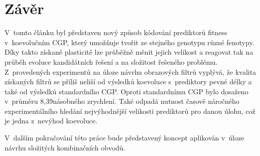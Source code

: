 \documentclass[czech]{ExcelAtFIT} %
\begin{document}
\section{Závěr}
\label{sec:Conclusions}

V~tomto článku byl představen nový způsob kódování prediktorů fitness v~koevolučním CGP, který umožňuje tvořit ze stejného genotypu různé fenotypy. Díky takto získaně plasticitě lze průběžně měnit jejich velikost a reagovat tak na průběh evoluce kandidátních řešení a na složitost řešeného problému. Z~provedených ex\-pe\-ri\-mentů na úloze návrhu obrazových filtrů vyplývá, že kvalita získaných filtrů se příliš neliší od výsledků koevoluce s~prediktory pevné délky a také od výsledků standardního CGP. Oproti standardnímu CGP bylo dosaženo v~průměru 8,39násobného zrychlení. Také odpadá nutnost časově náročného experimentálního hledání nejvýhodnější velikosti prediktorů pro danou úlohu, což je jedna z~nevýhod koevoluce.

V~dalším pokračování této práce bude představený koncept apli\-ko\-ván v~úloze návrhu složitých kombinačních obvodů.
\end{document}
